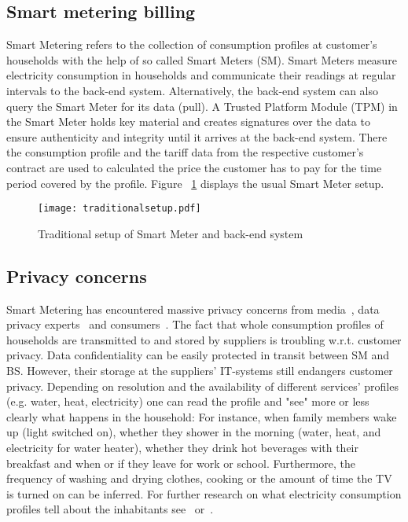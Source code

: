 \documentclass[english]{llncs}
\begin{document}
\subsection{Smart metering billing}

Smart Metering refers to the collection of consumption profiles at customer's households with the help of so called Smart Meters (SM).
Smart Meters measure electricity consumption in households and communicate their readings at regular intervals to the back-end system.
Alternatively, the  back-end system can also query the Smart Meter for its data (pull).
A Trusted Platform Module (TPM) in the Smart Meter holds key material and creates signatures over the data to ensure authenticity and integrity until it arrives at the back-end system.
There the consumption profile and the tariff data from the respective customer's contract are used to calculated the price the customer has to pay for the time period covered by the profile. 
Figure ~\ref{fig:traditionalsetup} displays the usual Smart Meter setup.

\begin{figure}
\texttt{[image: traditionalsetup.pdf]}
\caption{Traditional setup of Smart Meter and back-end system}
\label{fig:traditionalsetup}
\end{figure}

\subsection{Privacy concerns}
\label{privacyconcerns}
Smart Metering has encountered massive privacy concerns from media~\cite{ukprivacy}, data privacy experts~\cite{smartgridprivacy} and consumers~\cite{netherlandsstop}. 
The fact that whole consumption profiles of households are transmitted to and stored by suppliers is troubling w.r.t. customer privacy.
Data confidentiality can be easily protected in transit between SM and BS.
However, their storage at the suppliers' IT-systems still endangers customer privacy.
Depending on resolution and the availability of different services' profiles (e.g. water, heat, electricity) one can read the profile and "see" more or less clearly what happens in the household:
For instance, when family members wake up (light switched on), whether they shower in the morning (water, heat, and electricity for water heater), whether they drink hot beverages with their breakfast and when or if they leave for work or school.
Furthermore, the frequency of washing and drying clothes, cooking or the amount of time the TV is turned on can be inferred.
For further research on what electricity consumption profiles tell about the inhabitants see~\cite{appliancemonitoring} or~\cite{usemodekitchen}.
\end{document}
